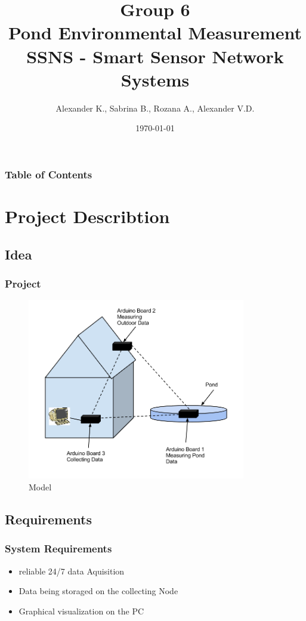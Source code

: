 \documentclass{beamer}
\title{Group 6\\
	Pond Environmental Measurement\\
	SSNS - Smart Sensor Network Systems}
\author{Alexander K.,
	Sabrina B.,
	Rozana A.,
	Alexander V.D.}
\institute[FHF] {Fachhochschule Frankfurt am Main - University of Applied Sciences}
\date 
{\today}
\begin{document}
\maketitle
\begin{frame}
\frametitle{Table of Contents}
\tableofcontents
\end{frame}

\section{Project Describtion} 
\subsection{Idea}
\frame
{
	\frametitle{Project}
	\begin{figure}[h!]
  		\centering
    	\includegraphics[width=0.85\textwidth]{../Images/ssns_project.png}
		\caption{Model}
	\end{figure}
}

\subsection{Requirements}
\frame
{
	\frametitle{System Requirements}
	\begin{itemize}
	\item reliable 24/7 data Aquisition
	\item Data being storaged on the collecting Node
	\item Graphical visualization on the PC
	\end{itemize}
}
\end{document}
